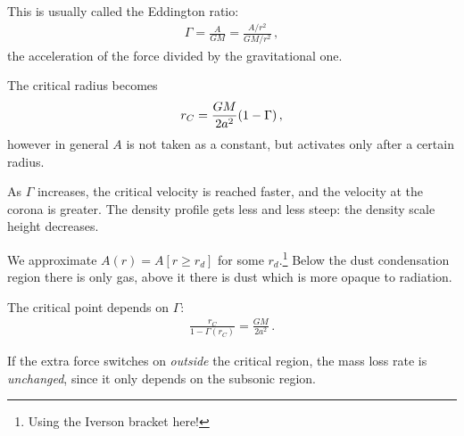 \documentclass[main.tex]{subfiles}
\begin{document}
This is usually called the Eddington ratio: 
%
\begin{align}
  \Gamma = \frac{A}{GM} = \frac{A/r^2}{GM / r^2}
\,,
\end{align}
%
the acceleration of the force divided by the gravitational one.


The critical radius becomes 
%
\begin{align}
  r_C = \frac{GM}{2a^2} \qty(1 - \Gamma )
\,,
\end{align}
%
however in general \(A\) is not taken as a constant, but activates only after a certain radius.

As \(\Gamma \) increases, the critical velocity is reached faster, and the velocity at the corona is greater.
The density profile gets less and less steep: the density scale height decreases.

We approximate \(A(r) = A [r \geq r_d]\) for some \(r_d\).\footnote{Using the Iverson bracket here!}
Below the dust condensation region there is only gas, above it there is dust which is more opaque to radiation.

The critical point depends on \(\Gamma \): 
%
\begin{align}
  \frac{r_C}{1 - \Gamma (r_C)} = \frac{GM}{2 a^2}
\,.
\end{align}
%

If the extra force switches on \emph{outside} the critical region, the mass loss rate is \emph{unchanged}, since it only depends on the subsonic region.

\end{document}
